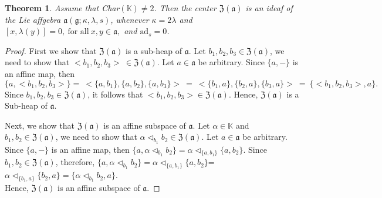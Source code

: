 \documentclass{article}
\newtheorem{theorem}{Theorem}[section]
\theoremstyle{definition}
\theoremstyle{remark}
\theoremstyle{plain}
\begin{document}
\begin{theorem}
Assume that Char$(\mathbb{K})\neq 2$. Then the center $\mathfrak{Z(a)}$ is an ideaf of the Lie affgebra $\mathfrak{a}(\mathfrak{g};\kappa, \lambda,s)$, whenever $\kappa=2\lambda$ and $[x, \lambda(y)]=0,~ \text{for all}~ x, y\in \mathfrak{a},$ and $\text{ad}_s=0$.
\end{theorem}

\begin{proof}
First we show that $\mathfrak{Z(a)}$ is a sub-heap of $\mathfrak{a}.$ Let $b_{1}, b_{2}, b_{3}\in \mathfrak{Z(a)}$, we need to show that $<b_{1}, b_{2}, b_{3}>~\in \mathfrak{Z(a)}$. Let $a \in \mathfrak{a}$ be arbitrary. Since $\{a, -\}$ is an affine map, then $$\{a, <b_{1}, b_{2}, b_{3}>\}=~<\{a, b_{1}\}, \{a, b_{2}\}, \{a, b_{3}\}>~=~<\{b_{1}, a\}, \{b_{2}, a\}, \{b_{3}, a\}>~=~\{<b_{1}, b_{2}, b_{3}>, a\}.$$ 
Since $b_{1}, b_{2}, b_{3}\in \mathfrak{Z(a)}$, it follows that $<b_{1}, b_{2}, b_{3}> \in \mathfrak{Z(a)}$. Hence, $\mathfrak{Z(a)}$ is a Sub-heap of $\mathfrak{a}.$

 Next, we show that $\mathfrak{Z(a)}$ is an affine subspace of $\mathfrak{a}.$ Let $\alpha \in \mathbb{K}$ and $b_{1}, b_{2} \in \mathfrak{Z(a)}$, we need to show that $\alpha \triangleleft_{b_{1}}b_{2} \in \mathfrak{Z(a)}$. Let $a\in \mathfrak{a}$ be arbitrary. Since $\{a, -\}$ is an affine map, then $\{a, \alpha \triangleleft_{b_{1}}b_{2}\}=\alpha \triangleleft_{\{a, b_{1}\}} \{a, b_{2}\}$.
    Since $b_{1}, b_{2}\in \mathfrak{Z(a)}$, therefore, $\{a, \alpha \triangleleft_{b_{1}}b_{2}\}=\alpha \triangleleft_{\{a, b_{1}\}} \{a, b_{2}\}$=$\alpha\triangleleft_{\{b_{1}, a\}}\{b_2, a\}=\{\alpha\triangleleft_{b_1}b_2,a\}.$\\
    Hence, $\mathfrak{Z(a)}$ is an affine subspace of $\mathfrak{a}.$


\end{proof}
\end{document}
